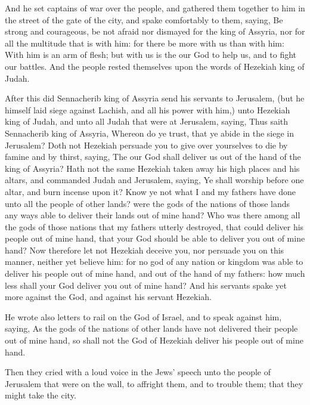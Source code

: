 \verse And he set captains of war over the people, and gathered them together to him in the street of the gate of the city, and spake comfortably to them, saying, \verse Be strong and courageous, be not afraid nor dismayed for the king of Assyria, nor for all the multitude that is with him: for there be more with us than with him: \verse With him is an arm of flesh; but with us is the \LORD our God to help us, and to fight our battles. And the people rested themselves upon the words of Hezekiah king of Judah.

\verse After this did Sennacherib king of Assyria send his servants to Jerusalem, (but he himself laid siege against Lachish, and all his power with him,) unto Hezekiah king of Judah, and unto all Judah that were at Jerusalem, saying, \verse Thus saith Sennacherib king of Assyria, Whereon do ye trust, that ye abide in the siege in Jerusalem?  \verse Doth not Hezekiah persuade you to give over yourselves to die by famine and by thirst, saying, The \LORD our God shall deliver us out of the hand of the king of Assyria?  \verse Hath not the same Hezekiah taken away his high places and his altars, and commanded Judah and Jerusalem, saying, Ye shall worship before one altar, and burn incense upon it?  \verse Know ye not what I and my fathers have done unto all the people of other lands? were the gods of the nations of those lands any ways able to deliver their lands out of mine hand?  \verse Who was there among all the gods of those nations that my fathers utterly destroyed, that could deliver his people out of mine hand, that your God should be able to deliver you out of mine hand?  \verse Now therefore let not Hezekiah deceive you, nor persuade you on this manner, neither yet believe him: for no god of any nation or kingdom was able to deliver his people out of mine hand, and out of the hand of my fathers: how much less shall your God deliver you out of mine hand?  \verse And his servants spake yet more against the \LORD God, and against his servant Hezekiah.

\verse He wrote also letters to rail on the \LORD God of Israel, and to speak against him, saying, As the gods of the nations of other lands have not delivered their people out of mine hand, so shall not the God of Hezekiah deliver his people out of mine hand.

\verse Then they cried with a loud voice in the Jews' speech unto the people of Jerusalem that were on the wall, to affright them, and to trouble them; that they might take the city.

